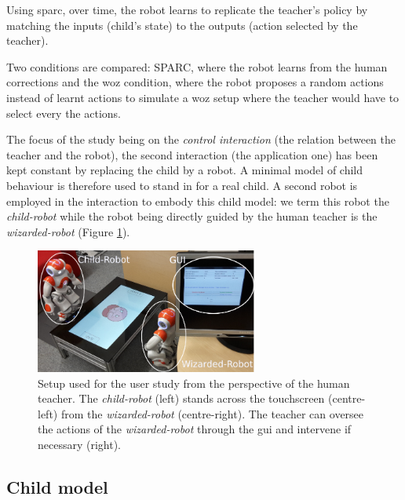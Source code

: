 Using \gls{sparc}, over time, the robot learns to replicate the teacher's policy by matching the inputs (child's state) to the outputs (action selected by the teacher). 


Two conditions are compared: SPARC, where the robot learns from the human corrections and the \gls{woz} condition, where the robot proposes a random actions instead of learnt actions to simulate a \gls{woz} setup where the teacher would have to select every the actions.

The focus of the study being on the \textit{control interaction} (the relation between the teacher and the robot), the second interaction (the application one) has been kept constant by replacing the child by a robot. A minimal model of child behaviour is therefore used to stand in for a real child. A second robot is employed in the interaction to embody this child model: we term this robot the \textit{child-robot} while the robot being directly guided by the human teacher is the \textit{wizarded-robot} (Figure \ref{fig:woz_setup}).

\begin{figure}[t!]
	\centering
	\includegraphics[width=0.65\textwidth]{setup_annotated.png}
	\caption{Setup used for the user study from the perspective of the human teacher. The \textit{child-robot} (left) stands across the touchscreen (centre-left) from the \textit{wizarded-robot} (centre-right). The teacher can oversee the actions of the \textit{wizarded-robot} through the \gls{gui} and intervene if necessary (right).}
	\label{fig:woz_setup}
\end{figure}
		
\subsection{Child model} \label{ssec:woz_child}

